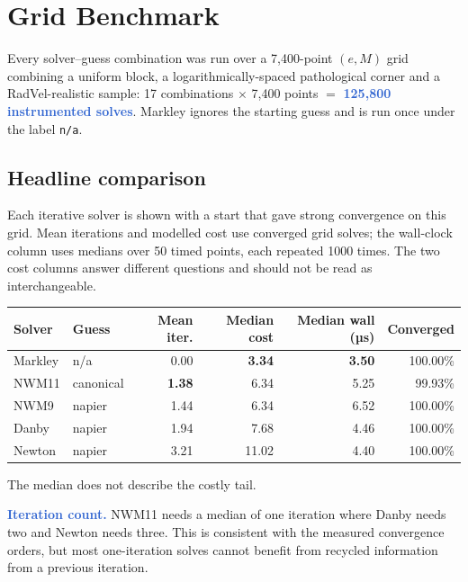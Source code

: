 \documentclass[11pt,a4paper]{article}
\newcommand{\key}[1]{\textcolor{Highlight}{\bfseries #1}}
\begin{document}
\section{Grid Benchmark}
\label{sec:grid}

Every solver--guess combination was run over a 7{,}400-point $(e,M)$ grid
combining a uniform block, a logarithmically-spaced pathological corner
and a RadVel-realistic sample: 17 combinations $\times$ 7{,}400 points
$=$ \key{125{,}800 instrumented solves}. Markley ignores the starting
guess and is run once under the label \texttt{n/a}.

\subsection{Headline comparison}

Each iterative solver is shown with a start that gave strong convergence
on this grid. Mean iterations and modelled cost use converged grid solves;
the wall-clock column uses medians over 50 timed points, each repeated
1000 times. The two cost columns answer different questions and should
not be read as interchangeable.

\begin{center}
\small
\begin{tabular}{@{}llrrrr@{}}
\toprule
\textbf{Solver} & \textbf{Guess} & \textbf{Mean iter.} & \textbf{Median cost} & \textbf{Median wall (µs)} & \textbf{Converged} \\
\midrule
Markley & n/a       & 0.00 & \textbf{3.34} & \textbf{3.50} & 100.00\% \\
NWM11   & canonical & \textbf{1.38} & 6.34 & 5.25 & 99.93\% \\
NWM9    & napier    & 1.44 & 6.34 & 6.52 & 100.00\% \\
Danby   & napier    & 1.94 & 7.68 & 4.46 & 100.00\% \\
Newton  & napier    & 3.21 & 11.02 & 4.40 & 100.00\% \\
\bottomrule
\end{tabular}
\end{center}

The median does not describe the costly tail.

\key{Iteration count.} NWM11 needs a median of one iteration where Danby
needs two and Newton needs three. This is consistent with the measured
convergence orders, but most one-iteration solves cannot benefit from
recycled information from a previous iteration.
\end{document}
